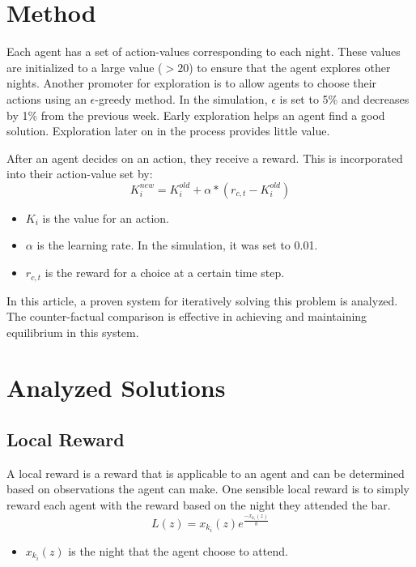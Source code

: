 \documentclass[letterpaper, 10 pt, conference]{ieeeconf}
\begin{document}
\section{Method}
\label{sec:method}
Each agent has a set of action-values corresponding to each night.  These values are initialized to a large value ($>20$) to ensure that the agent explores other nights.  Another promoter for exploration is to allow agents to choose their actions using an $\epsilon$-greedy method.  In the simulation, $\epsilon$ is set to 5\% and decreases by 1\% from the previous week.  Early exploration helps an agent find a good solution.  Exploration later on in the process provides little value.  

After an agent decides on an action, they receive a reward.  This is incorporated into their action-value set by:
\begin{equation}
    K_i^{new} = K_i^{old} + \alpha*(r_{c,t} - K_i^{old})
\end{equation}
\begin{itemize}
    \item $K_i$ is the value for an action.
    \item $\alpha$ is the learning rate.  In the simulation, it was set to 0.01.
    \item $r_{c,t}$ is the reward for a choice at a certain time step.
\end{itemize}

In this article, a proven system for iteratively solving this problem is analyzed.  The counter-factual comparison is effective in achieving and maintaining equilibrium in this system.

\section{Analyzed Solutions}
\label{sec:proposed solutions}
\subsection{Local Reward}
A local reward is a reward that is applicable to an agent and can be determined based on observations the agent can make.  One sensible local reward is to simply reward each agent with the reward based on the night they attended the bar.  
\begin{equation}
    L(z) = x_{k_i}(z)e^{\frac{-x_{k_i}(z)}{b}}
\end{equation}

\begin{itemize}
    \item $x_{k_i}(z)$ is the night that the agent choose to attend.
\end{itemize}
\end{document}
